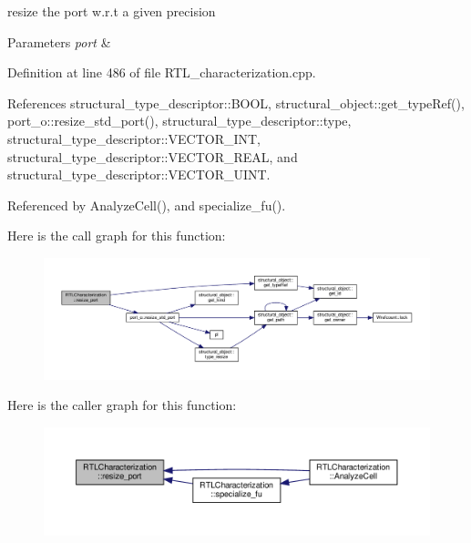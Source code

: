 resize the port w.\+r.\+t a given precision 


\begin{DoxyParams}{Parameters}
{\em port} & \\
\hline
\end{DoxyParams}


Definition at line 486 of file R\+T\+L\+\_\+characterization.\+cpp.



References structural\+\_\+type\+\_\+descriptor\+::\+B\+O\+OL, structural\+\_\+object\+::get\+\_\+type\+Ref(), port\+\_\+o\+::resize\+\_\+std\+\_\+port(), structural\+\_\+type\+\_\+descriptor\+::type, structural\+\_\+type\+\_\+descriptor\+::\+V\+E\+C\+T\+O\+R\+\_\+\+I\+NT, structural\+\_\+type\+\_\+descriptor\+::\+V\+E\+C\+T\+O\+R\+\_\+\+R\+E\+AL, and structural\+\_\+type\+\_\+descriptor\+::\+V\+E\+C\+T\+O\+R\+\_\+\+U\+I\+NT.



Referenced by Analyze\+Cell(), and specialize\+\_\+fu().

Here is the call graph for this function\+:
\nopagebreak
\begin{figure}[H]
\begin{center}
\leavevmode
\includegraphics[width=350pt]{d9/d84/classRTLCharacterization_a4f479d21fdda0208fad8b538edccad9c_cgraph}
\end{center}
\end{figure}
Here is the caller graph for this function\+:
\nopagebreak
\begin{figure}[H]
\begin{center}
\leavevmode
\includegraphics[width=350pt]{d9/d84/classRTLCharacterization_a4f479d21fdda0208fad8b538edccad9c_icgraph}
\end{center}
\end{figure}
\mbox{\label{classRTLCharacterization_a39ae864464f1d90f555f8c6d682e65b2}} 
